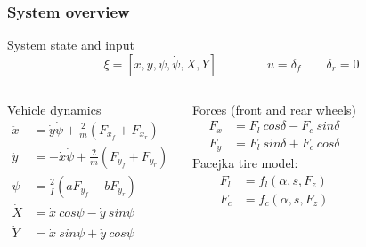 \documentclass{beamer}
\begin{document}
\begin{frame}
\frametitle{System overview}

\begin{block}{System state and input}
\[\xi = [\dot{x}, \dot{y}, \psi, \dot{\psi}, X, Y] \qquad \qquad u = \delta_f \qquad \delta_r = 0\]
\end{block}

\begin{columns}[t,onlytextwidth]
\begin{block}{Vehicle dynamics}
\begin{align*}
\ddot{x} &= \dot{y} \dot{\psi} + \frac{2}{m} (F_{x_f} + F_{x_r}) \\
\ddot{y} &= - \dot{x} \dot{\psi} + \frac{2}{m} (F_{y_f} + F_{y_r}) \\
\ddot{\psi} &= \frac{2}{I} (a F_{y_f} - b F_{y_r}) \\
\dot{X} &= \dot{x} \ cos \psi - \dot{y} \ sin \psi \\
\dot{Y} &= \dot{x} \ sin \psi + \dot{y} \ cos \psi
\end{align*}
\end{block}

\begin{block}{Forces (front and rear wheels)}
\begin{align*}
F_x &= F_l \ cos \delta - F_c \ sin \delta \\
F_y &= F_l \ sin \delta + F_c \ cos \delta
\end{align*}
Pacejka tire model:
\begin{align*}
F_l &= f_l(\alpha, s, F_z) \\
F_c &= f_c(\alpha, s, F_z)
\end{align*}
\end{block}

\end{columns}

\end{frame}
\end{document}

